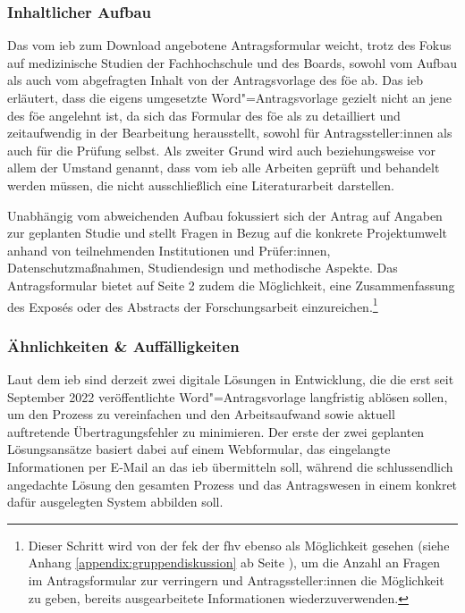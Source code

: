 \documentclass[a4paper,12pt,twoside]{scrreprt}
\begin{document}
\subsubsection*{Inhaltlicher Aufbau}
\label{sub-sub-sec:fh-oö-inhaltlicher-aufbau}

Das vom \ac{ieb} zum Download angebotene Antragsformular weicht, trotz des Fokus auf medizinische Studien der Fachhochschule und des Boards, sowohl vom Aufbau als auch vom abgefragten Inhalt von der Antragsvorlage des \ac{föe} ab. Das \ac{ieb} erläutert, dass die eigens umgesetzte Word"=Antragsvorlage gezielt nicht an jene des \ac{föe} angelehnt ist, da sich das Formular des \ac{föe} als zu detailliert und zeitaufwendig in der Bearbeitung herausstellt, sowohl für Antragssteller:innen als auch für die Prüfung selbst. Als zweiter Grund wird auch beziehungsweise vor allem der Umstand genannt, dass vom \ac{ieb} alle Arbeiten geprüft und behandelt werden müssen, die nicht ausschließlich eine Literaturarbeit darstellen. \cite{rosendahl-huber_extern-erfahrungen_2023}

\medskip

Unabhängig vom abweichenden Aufbau fokussiert sich der Antrag auf Angaben zur geplanten Studie und stellt Fragen in Bezug auf die konkrete Projektumwelt anhand von teilnehmenden Institutionen und Prüfer:innen, Datenschutzmaßnahmen, Studiendesign und methodische Aspekte. Das Antragsformular bietet auf Seite 2 zudem die Möglichkeit, eine Zusammenfassung des Exposés oder des Abstracts der Forschungsarbeit einzureichen.\footnote{Dieser Schritt wird von der \ac{fek} der \ac{fhv} ebenso als Möglichkeit gesehen (siehe Anhang \ref{appendix:gruppendiskussion} ab Seite \pageref{appendix:gruppendiskussion}), um die Anzahl an Fragen im Antragsformular zur verringern und Antragssteller:innen die Möglichkeit zu geben, bereits ausgearbeitete Informationen wiederzuverwenden.}

\subsubsection*{Ähnlichkeiten \& Auffälligkeiten}
\label{sub-sub-sec:ähnlichkeiten-auffälligkeiten-fh-oö}

Laut dem \ac{ieb} sind derzeit zwei digitale Lösungen in Entwicklung, die die erst seit September 2022 veröffentlichte Word"=Antragsvorlage langfristig ablösen sollen, um den Prozess zu vereinfachen und den Arbeitsaufwand sowie aktuell auftretende Übertragungsfehler zu minimieren. Der erste der zwei geplanten Lösungsansätze basiert dabei auf einem Webformular, das eingelangte Informationen per E-Mail an das \ac{ieb} übermitteln soll, während die schlussendlich angedachte Lösung den gesamten Prozess und das Antragswesen in einem konkret dafür ausgelegten System abbilden soll. \cite{rosendahl-huber_extern-erfahrungen_2023}
\end{document}
